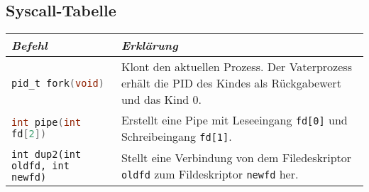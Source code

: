 \documentclass[11pt]{scrartcl}
\begin{document}
\subsection{Syscall-Tabelle}
\begin{tabular}{|p{4.5cm}|p{9cm}|}
\hline
\textit{Befehl} & \textit{Erklärung}\\
\hline
{\lstinline[language=C]!pid_t fork(void)!} & Klont den aktuellen Prozess. Der Vaterprozess erhält die PID des Kindes als Rückgabewert und das Kind 0.\\
\hline
{\lstinline[language=C]!int pipe(int fd[2])!} & Erstellt eine Pipe mit Leseeingang \texttt{fd{[}0{]}} und Schreibeingang \texttt{fd{[}1{]}}.\\
\hline
\texttt{int dup2(int oldfd, int newfd)} & Stellt eine Verbindung von dem Filedeskriptor \texttt{oldfd} zum Fildeskriptor \texttt{newfd} her.\\
\hline
\end{tabular}
\end{document}
